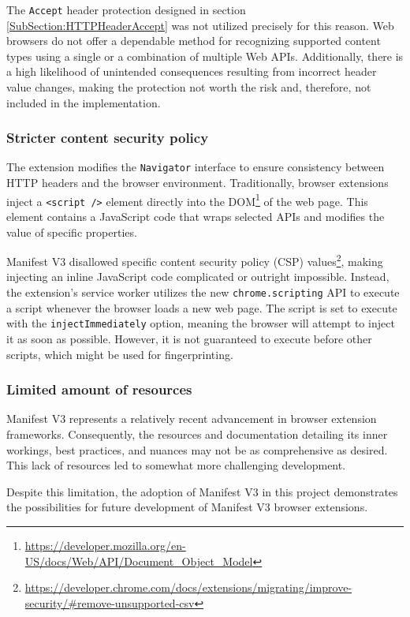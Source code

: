 The \texttt{Accept} header protection designed in section \ref{SubSection:HTTPHeaderAccept} was not utilized precisely for this reason. Web browsers do not offer a dependable method for recognizing supported content types using a single or a combination of multiple Web APIs. Additionally, there is a high likelihood of unintended consequences resulting from incorrect header value changes, making the protection not worth the risk and, therefore, not included in the implementation.

\subsubsection{Stricter content security policy}

The extension modifies the \texttt{Navigator} interface to ensure consistency between HTTP headers and the browser environment. Traditionally, browser extensions inject a \texttt{<script />} element directly into the DOM\footnote{\url{https://developer.mozilla.org/en-US/docs/Web/API/Document_Object_Model}} of the web page. This element contains a JavaScript code that wraps selected APIs and modifies the value of specific properties.

Manifest V3 disallowed specific content security policy (CSP) values\footnote{\url{https://developer.chrome.com/docs/extensions/migrating/improve-security/\#remove-unsupported-csv}}, making injecting an inline JavaScript code complicated or outright impossible. Instead, the extension's service worker utilizes the new \texttt{chrome.scripting} API to execute a script whenever the browser loads a new web page. The script is set to execute with the \texttt{injectImmediately} option, meaning the browser will attempt to inject it as soon as possible. However, it is not guaranteed to execute before other scripts, which might be used for fingerprinting.

\subsubsection{Limited amount of resources}

Manifest V3 represents a relatively recent advancement in browser extension frameworks. Consequently, the resources and documentation detailing its inner workings, best practices, and nuances may not be as comprehensive as desired. This lack of resources led to somewhat more challenging development.

Despite this limitation, the adoption of Manifest V3 in this project demonstrates the possibilities for future development of Manifest V3 browser extensions.


